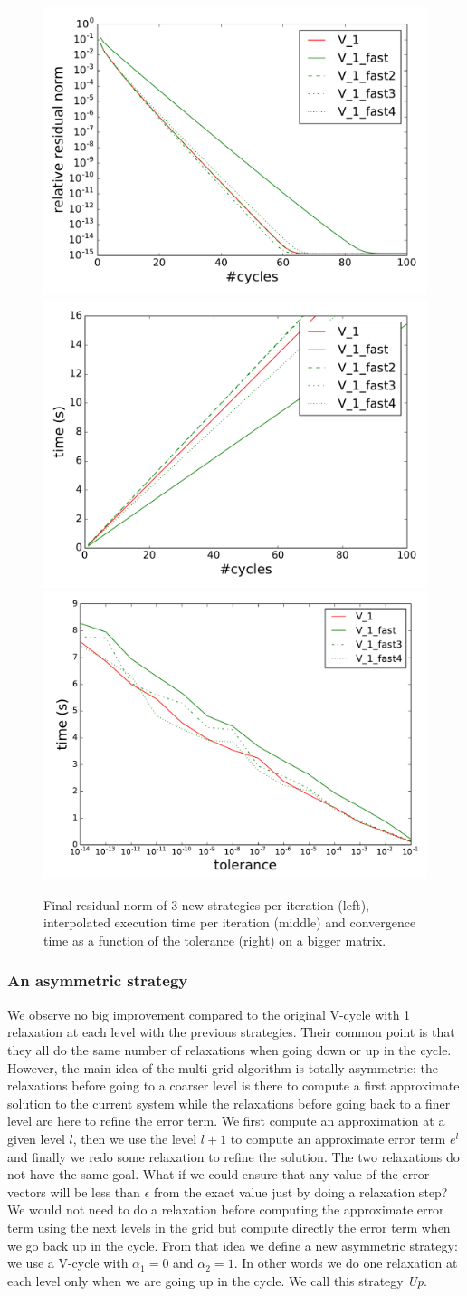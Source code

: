   \begin{figure}
  \includegraphics[width=0.33\linewidth]{figs/convergence_fast_norm.pdf}
  \includegraphics[width=0.33\linewidth]{figs/convergence_fast_time.pdf}
   \includegraphics[width=0.33\linewidth]{figs/time_convergence_fast.pdf}
  \caption{Final residual norm of 3 new strategies per iteration (left), interpolated execution time per iteration (middle) and convergence time as a function of the tolerance (right) on a bigger matrix.}
   \label{fig.newstrat}
  \end{figure}
  
\subsubsection{An asymmetric strategy}
\label{sec.assymetric}
  We observe no big improvement compared to the original V-cycle with 1 relaxation at each level with the previous strategies.
  Their common point is that they all do the same number of relaxations when going down or up in the cycle. However, the main idea of the multi-grid algorithm is totally asymmetric: the relaxations before
going to a coarser level is there to compute a first approximate solution to the current system while the relaxations before going back to a finer level are here to refine the error term.
  We first compute an approximation at a given level $l$, then we use the level $l+1$ to compute an approximate error term $e^l$ and finally we redo some relaxation to refine the solution. The two relaxations do not have the same goal.
  What if we could ensure that any value of the error vectors will be less than $\epsilon$ from the exact value just by doing a relaxation step? We would not need to do a relaxation
  before computing the approximate error term using the next levels in the grid but compute directly the error term when we go back up in the cycle. From that idea we define a new asymmetric strategy: we use a V-cycle with $\alpha_1 = 0$ and $\alpha_2 = 1$. In other words
  we do one relaxation at each level only when we are going up in the cycle. We call this strategy \emph{Up}.
  
